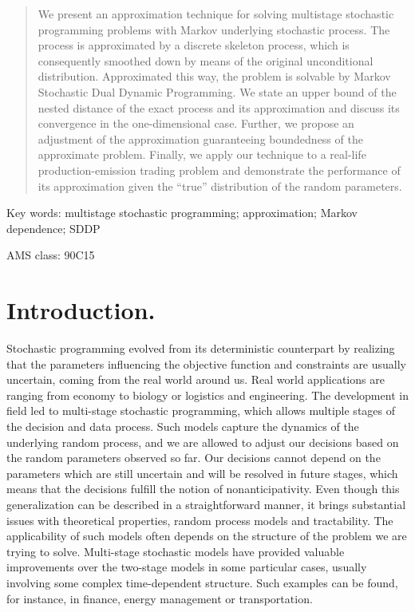 \documentclass{article}              %
\begin{document}

\maketitle
\begin{abstract}
We present an approximation technique for solving multistage stochastic programming problems with Markov underlying stochastic process. The process is approximated by a discrete skeleton process, which is consequently smoothed down by means of the original unconditional distribution. Approximated this way, the problem is solvable by Markov Stochastic Dual Dynamic Programming. We state an upper bound of the nested distance of the exact process and its approximation and discuss its convergence in the one-dimensional case. Further, we propose an adjustment of the approximation guaranteeing boundedness of the approximate problem. Finally, we apply our technique to a real-life  production-emission trading problem and demonstrate the performance of its approximation given the ``true'' distribution of the random parameters.
\end{abstract}

\noindent Key words: multistage stochastic programming; approximation; Markov dependence; SDDP

\noindent AMS class: 90C15

\section{Introduction.}

Stochastic programming evolved from its deterministic counterpart by realizing that the parameters influencing the objective function and constraints are usually uncertain, coming from the real world around us. Real world applications are ranging from economy to biology or logistics and engineering. The development in field led to multi-stage stochastic programming, which allows multiple stages of the decision and data process. Such models capture the dynamics of the underlying random process, and we are allowed to adjust our decisions based on the random parameters observed so far. Our decisions cannot depend on the parameters which are still uncertain and will be resolved in future stages, which means that the decisions fulfill the notion of nonanticipativity. Even though this generalization can be described in a straightforward manner, it brings substantial issues with theoretical properties, random process models and tractability. The applicability of such models often depends on the structure of the problem we are trying to solve. Multi-stage stochastic models have provided valuable improvements over the two-stage models in some particular cases, usually involving some complex time-dependent structure. Such examples can be found, for instance, in finance, energy management or transportation.
\end{document}
